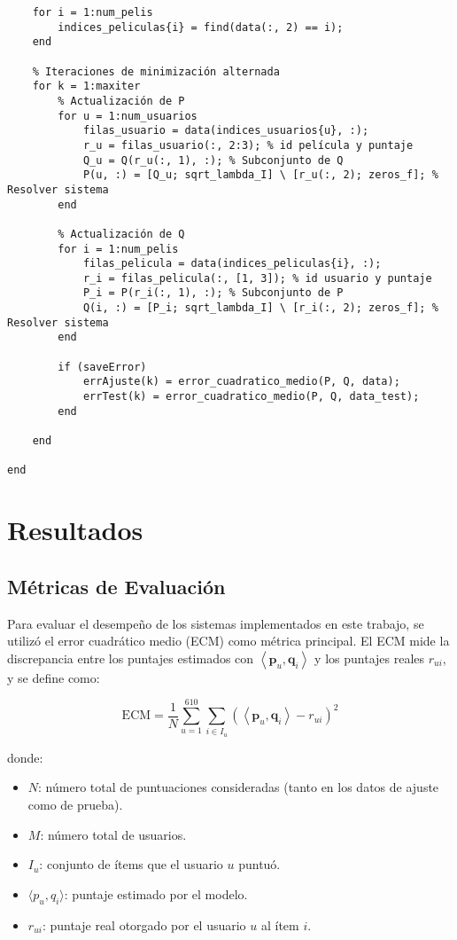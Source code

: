 \documentclass[12pt,a4paper]{article}
\begin{document}
\begin{lstlisting}
    for i = 1:num_pelis
        indices_peliculas{i} = find(data(:, 2) == i);
    end

    % Iteraciones de minimización alternada
    for k = 1:maxiter
        % Actualización de P
        for u = 1:num_usuarios
            filas_usuario = data(indices_usuarios{u}, :);
            r_u = filas_usuario(:, 2:3); % id película y puntaje
            Q_u = Q(r_u(:, 1), :); % Subconjunto de Q
            P(u, :) = [Q_u; sqrt_lambda_I] \ [r_u(:, 2); zeros_f]; % Resolver sistema
        end

        % Actualización de Q
        for i = 1:num_pelis
            filas_pelicula = data(indices_peliculas{i}, :);
            r_i = filas_pelicula(:, [1, 3]); % id usuario y puntaje
            P_i = P(r_i(:, 1), :); % Subconjunto de P
            Q(i, :) = [P_i; sqrt_lambda_I] \ [r_i(:, 2); zeros_f]; % Resolver sistema
        end

        if (saveError)
            errAjuste(k) = error_cuadratico_medio(P, Q, data);
            errTest(k) = error_cuadratico_medio(P, Q, data_test);
        end

    end

end

\end{lstlisting}
\section*{Resultados}
\subsection*{Métricas de Evaluación}
Para evaluar el desempeño de los sistemas implementados en este trabajo, se utilizó el error cuadrático medio (ECM) como métrica principal. El ECM mide la discrepancia entre los puntajes estimados con \(\left\langle \mathbf{p}_u , \mathbf{q}_i \right\rangle \) y los puntajes reales \(r_{ui}\), y se define como:

\begin{equation}\label{eq:ecm}
  \text{ECM} = \frac{1}{N} \sum_{u=1}^{610} \sum_{i \in I_u} (\left\langle \mathbf{p}_u , \mathbf{q}_i \right\rangle - r_{ui})^2
\end{equation}

donde:
\begin{itemize}
  \item \( N \): número total de puntuaciones consideradas (tanto en los datos de ajuste como de prueba).
  \item \( M \): número total de usuarios.
  \item \( I_u \): conjunto de ítems que el usuario \( u \) puntuó.
  \item \( \langle p_u, q_i \rangle \): puntaje estimado por el modelo.
  \item \( r_{ui} \): puntaje real otorgado por el usuario \( u \) al ítem \( i \).
\end{itemize}
\end{document}
